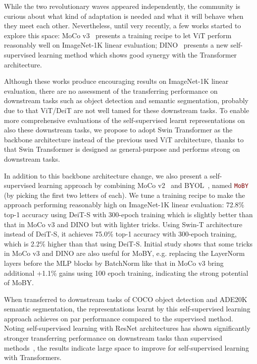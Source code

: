 \documentclass{article}
\begin{document}
While the two revolutionary waves appeared independently, the community is curious about what kind of adaptation is needed and what it will behave when they meet each other. Nevertheless, until very recently, a few works started to explore this space: MoCo v3~\citep{mocov3} presents a training recipe to let ViT perform reasonably well on ImageNet-1K linear evaluation; DINO~\citep{dino} presents a new self-supervised learning method which shows good synergy with the Transformer architecture.

Although these works produce encouraging results on ImageNet-1K linear evaluation, there are no assessment of the transferring performance on downstream tasks such as object detection and semantic segmentation, probably due to that ViT/DeiT are not well tamed for these downstream tasks. To enable more comprehensive evaluations of the self-supervised learnt representations on also these downstream tasks, we propose to adopt Swin Transformer as the backbone architecture instead of the previous used ViT architecture, thanks to that Swin Transformer is designed as general-purpose and performs strong on downstream tasks.

In addition to this backbone architecture change, we also present a self-supervised learning approach by combining MoCo v2~\citep{mocov2} and BYOL~\citep{byol}, named \textcolor{Maroon}{\texttt{MoBY}} (by picking the first two letters of each). We tune a training recipe to make the approach performing reasonably high on ImageNet-1K linear evaluation: 72.8\% top-1 accuracy using DeiT-S with 300-epoch training which is slightly better than that in MoCo v3 and DINO but with lighter tricks. Using Swin-T architecture instead of DeiT-S, it achieves 75.0\% top-1 accuracy with 300-epoch training, which is 2.2\% higher than that using DeiT-S. 
Initial study shows that some tricks in MoCo v3 and DINO are also useful for MoBY, e.g. replacing the LayerNorm layers before the MLP blocks by BatchNorm like that in MoCo v3 bring additional +1.1\% gains using 100 epoch training, indicating the strong potential of MoBY.

When transferred to downstream tasks of COCO object detection and ADE20K semantic segmentation, the representations learnt by this self-supervised learning approach achieves on par performance compared to the supervised method. Noting self-supervised learning with ResNet architectures has shown significantly stronger transferring performance on downstream tasks than supervised methods~\citep{moco,pixpro,henaff2021efficient}, the results indicate large space to improve for self-supervised learning with Transformers.
\end{document}
